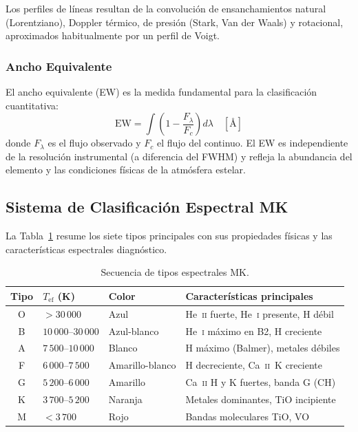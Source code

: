 \documentclass[12pt,a4paper]{article}
\begin{document}
Los perfiles de líneas resultan de la convolución de ensanchamientos natural
(Lorentziano), Doppler térmico, de presión (Stark, Van der Waals) y rotacional,
aproximados habitualmente por un perfil de Voigt.

\subsubsection{Ancho Equivalente}

El ancho equivalente (EW) es la medida fundamental para la clasificación cuantitativa:
\begin{equation}
  \mathrm{EW} = \int \left(1 - \frac{F_\lambda}{F_c}\right) d\lambda \quad [\text{\AA}]
\end{equation}
donde $F_\lambda$ es el flujo observado y $F_c$ el flujo del continuo. El EW es
independiente de la resolución instrumental (a diferencia del FWHM) y refleja la
abundancia del elemento y las condiciones físicas de la atmósfera estelar.

\subsection{Sistema de Clasificación Espectral MK}

La Tabla~\ref{tab:mk} resume los siete tipos principales con sus propiedades físicas y
las características espectrales diagnóstico.

\begin{table}[H]
  \centering
  \caption{Secuencia de tipos espectrales MK.}
  \label{tab:mk}
  \renewcommand{\arraystretch}{1.25}
  \begin{tabular}{cllp{6cm}}
    \toprule
    \textbf{Tipo} & \textbf{$T_\mathrm{ef}$ (K)} & \textbf{Color} &
    \textbf{Características principales} \\
    \midrule
    O & $>30\,000$ & Azul & He~\textsc{ii} fuerte, He~\textsc{i} presente, H débil \\
    B & $10\,000$--$30\,000$ & Azul-blanco & He~\textsc{i} máximo en B2, H creciente \\
    A & $7\,500$--$10\,000$ & Blanco & H máximo (Balmer), metales débiles \\
    F & $6\,000$--$7\,500$ & Amarillo-blanco & H decreciente, Ca~\textsc{ii}~K creciente \\
    G & $5\,200$--$6\,000$ & Amarillo & Ca~\textsc{ii} H y K fuertes, banda G (CH) \\
    K & $3\,700$--$5\,200$ & Naranja & Metales dominantes, TiO incipiente \\
    M & $<3\,700$ & Rojo & Bandas moleculares TiO, VO \\
    \bottomrule
  \end{tabular}
\end{table}
\end{document}

